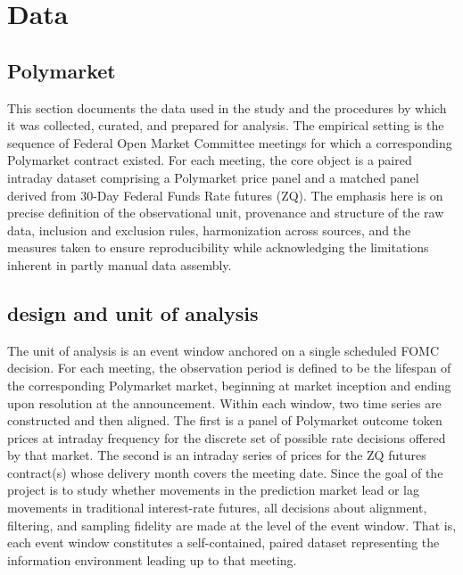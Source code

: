 
\section{Data}

\subsection{Polymarket} \label{sec:polymarket_data}




This section documents the data used in the study and the procedures by which it was collected, curated, and prepared for analysis. The empirical setting is the sequence of Federal Open Market Committee meetings for which a corresponding Polymarket contract existed. For each meeting, the core object is a paired intraday dataset comprising a Polymarket price panel and a matched panel derived from 30-Day Federal Funds Rate futures (ZQ). The emphasis here is on precise definition of the observational unit, provenance and structure of the raw data, inclusion and exclusion rules, harmonization across sources, and the measures taken to ensure reproducibility while acknowledging the limitations inherent in partly manual data assembly.

\subsection{design and unit of analysis}

The unit of analysis is an event window anchored on a single scheduled FOMC decision. For each meeting, the observation period is defined to be the lifespan of the corresponding Polymarket market, beginning at market inception and ending upon resolution at the announcement. Within each window, two time series are constructed and then aligned. The first is a panel of Polymarket outcome token prices at intraday frequency for the discrete set of possible rate decisions offered by that market. The second is an intraday series of prices for the ZQ futures contract(s) whose delivery month covers the meeting date. Since the goal of the project is to study whether movements in the prediction market lead or lag movements in traditional interest-rate futures, all decisions about alignment, filtering, and sampling fidelity are made at the level of the event window. That is, each event window constitutes a self-contained, paired dataset representing the information environment leading up to that meeting.

